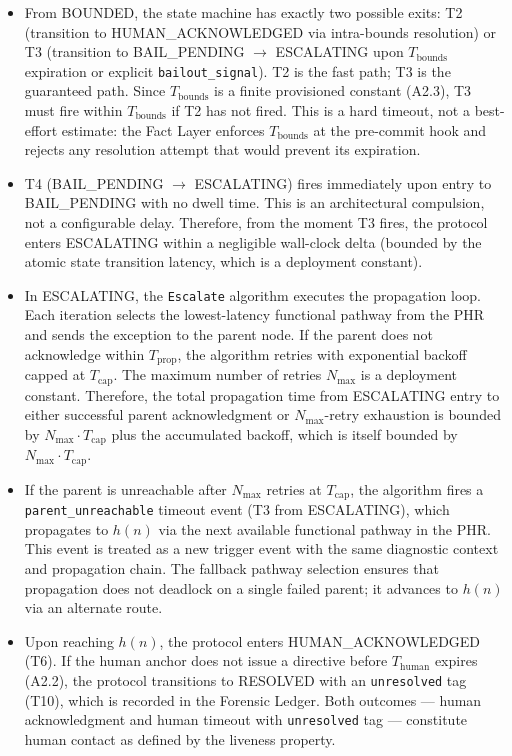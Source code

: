 \begin{itemize}
\item[\textbf{Step 1.}] From BOUNDED, the state machine has exactly two possible exits: T2 (transition to HUMAN\_ACKNOWLEDGED via intra-bounds resolution) or T3 (transition to BAIL\_PENDING $\rightarrow$ ESCALATING upon $T_{\text{bounds}}$ expiration or explicit \texttt{bailout\_signal}). T2 is the fast path; T3 is the guaranteed path. Since $T_{\text{bounds}}$ is a finite provisioned constant (A2.3), T3 must fire within $T_{\text{bounds}}$ if T2 has not fired. This is a hard timeout, not a best-effort estimate: the Fact Layer enforces $T_{\text{bounds}}$ at the pre-commit hook and rejects any resolution attempt that would prevent its expiration.

\item[\textbf{Step 2.}] T4 (BAIL\_PENDING $\rightarrow$ ESCALATING) fires immediately upon entry to BAIL\_PENDING with no dwell time. This is an architectural compulsion, not a configurable delay. Therefore, from the moment T3 fires, the protocol enters ESCALATING within a negligible wall-clock delta (bounded by the atomic state transition latency, which is a deployment constant).

\item[\textbf{Step 3.}] In ESCALATING, the \texttt{Escalate} algorithm executes the propagation loop. Each iteration selects the lowest-latency functional pathway from the PHR and sends the exception to the parent node. If the parent does not acknowledge within $T_{\text{prop}}$, the algorithm retries with exponential backoff capped at $T_{\text{cap}}$. The maximum number of retries $N_{\max}$ is a deployment constant. Therefore, the total propagation time from ESCALATING entry to either successful parent acknowledgment or $N_{\max}$-retry exhaustion is bounded by $N_{\max} \cdot T_{\text{cap}}$ plus the accumulated backoff, which is itself bounded by $N_{\max} \cdot T_{\text{cap}}$.

\item[\textbf{Step 4.}] If the parent is unreachable after $N_{\max}$ retries at $T_{\text{cap}}$, the algorithm fires a \texttt{parent\_unreachable} timeout event (T3 from ESCALATING), which propagates to $h(n)$ via the next available functional pathway in the PHR. This event is treated as a new trigger event with the same diagnostic context and propagation chain. The fallback pathway selection ensures that propagation does not deadlock on a single failed parent; it advances to $h(n)$ via an alternate route.

\item[\textbf{Step 5.}] Upon reaching $h(n)$, the protocol enters HUMAN\_ACKNOWLEDGED (T6). If the human anchor does not issue a directive before $T_{\text{human}}$ expires (A2.2), the protocol transitions to RESOLVED with an \texttt{unresolved} tag (T10), which is recorded in the Forensic Ledger. Both outcomes — human acknowledgment and human timeout with \texttt{unresolved} tag — constitute human contact as defined by the liveness property.
\end{itemize}

